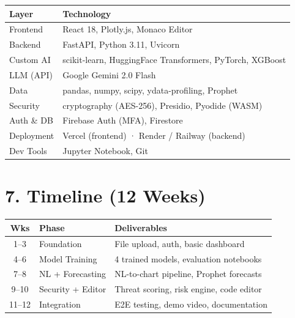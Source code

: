 \documentclass[10pt,twocolumn]{article}
\begin{document}
\begin{center}
\small
\begin{tabularx}{\columnwidth}{@{}l X@{}}
\toprule
\textbf{Layer} & \textbf{Technology} \\
\midrule
Frontend        & React 18, Plotly.js, Monaco Editor \\
Backend         & FastAPI, Python 3.11, Uvicorn \\
Custom AI       & scikit-learn, HuggingFace Transformers, PyTorch, XGBoost \\
LLM (API)       & Google Gemini 2.0 Flash \\
Data            & pandas, numpy, scipy, ydata-profiling, Prophet \\
Security        & cryptography (AES-256), Presidio, Pyodide (WASM) \\
Auth \& DB      & Firebase Auth (MFA), Firestore \\
Deployment      & Vercel (frontend) · Render / Railway (backend) \\
Dev Tools       & Jupyter Notebook, Git \\
\bottomrule
\end{tabularx}
\end{center}

\section{7. Timeline (12 Weeks)}

\begin{center}
\small
\begin{tabularx}{\columnwidth}{@{}c l X@{}}
\toprule
\textbf{Wks} & \textbf{Phase} & \textbf{Deliverables} \\
\midrule
1--3  & Foundation       & File upload, auth, basic dashboard \\
4--6  & Model Training   & 4 trained models, evaluation notebooks \\
7--8  & NL + Forecasting & NL-to-chart pipeline, Prophet forecasts \\
9--10 & Security + Editor & Threat scoring, risk engine, code editor \\
11--12 & Integration     & E2E testing, demo video, documentation \\
\bottomrule
\end{tabularx}
\end{center}

\end{document}
